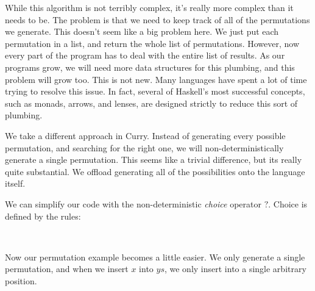 \documentclass{book}
\theoremstyle{definition}
\newcommand{\Varid}[1]{\mathit{#1}}
\def\resethooks{%
  \global\let\SaveRestoreHook\empty
  \global\let\ColumnHook\empty}
\let\hspre\empty
\let\hspost\empty
\begin{document}
While this algorithm is not terribly complex, it's really more complex than it needs to be.
The problem is that we need to keep track of all of the permutations we generate.
This doesn't seem like a big problem here.
We just put each permutation in a list, and return the whole list of permutations.
However, now every part of the program has to deal with the entire list of results.
As our programs grow, we will need more data structures for this plumbing, and this problem will grow too.
This is not new.
Many languages have spent a lot of time trying to resolve this issue.
In fact, several of Haskell's most successful concepts,
such as monads, arrows, and lenses, are designed strictly to reduce this sort of plumbing.

We take a different approach in Curry.
Instead of generating every possible permutation, and searching for the right one,
we will non-deterministically generate a single permutation.
This seems like a trivial difference, but its really quite substantial.
We offload generating all of the possibilities onto the language itself.

We can simplify our code with the non-deterministic \textit{choice} operator \ensuremath{\mathbin{?}}.
Choice is defined by the rules:\begin{hscode}\SaveRestoreHook
\column{B}{@{}>{\hspre}l<{\hspost}@{}}%
\column{3}{@{}>{\hspre}l<{\hspost}@{}}%
\column{E}{@{}>{\hspre}l<{\hspost}@{}}%
\>[3]{}\Varid{x}\Varid{y}\mathrel{=}\Varid{x}{}\<[E]%
\\
\>[3]{}\Varid{x}\Varid{y}\mathrel{=}\Varid{y}{}\<[E]%
\ColumnHook
\end{hscode}\resethooks
Now our permutation example becomes a little easier.
We only generate a single permutation,
and when we insert \ensuremath{\Varid{x}} into \ensuremath{\Varid{ys}}, we only insert into a single arbitrary position.
\end{document}
